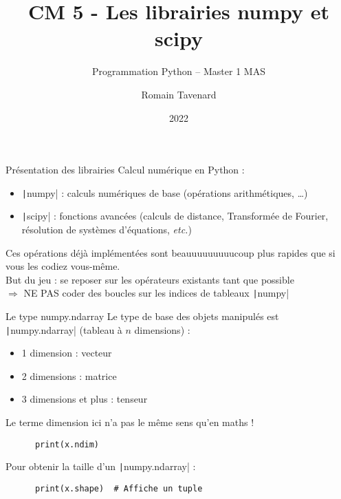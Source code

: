 \documentclass[10pt]{beamer}
\title[M1 MAS -- Python -- numpy]{CM 5 - Les librairies numpy et scipy}
\subtitle{Programmation Python -- Master 1 MAS}
\author{Romain Tavenard}
\date{2022}
\institute{%
\hypersetup{urlcolor=.}
\makebox[2.2ex][c]{\faEnvelope}\enspace\href{mailto:romain.tavenard@univ-rennes2.fr}{\texttt{romain.tavenard@univ-rennes2.fr}}\\%
}
\begin{document}
\maketitle

\begin{frame}[fragile]{Présentation des librairies}  
  Calcul numérique en Python :
  \begin{itemize}
    \item \texttt|numpy| : calculs numériques de base (opérations arithmétiques, \dots)
    \item \texttt|scipy| : fonctions avancées (calculs de distance, Transformée de Fourier, résolution de systèmes d'équations, \emph{etc.})
  \end{itemize}

  \pause

  Ces opérations déjà implémentées sont \alert{beauuuuuuuuucoup} plus rapides que si vous les codiez vous-même. \\
  \alert{But du jeu :} se reposer sur les opérateurs existants tant que possible \\
  $\Rightarrow$ \alert{NE PAS} coder des boucles sur les indices de tableaux \texttt|numpy|

\end{frame}

\begin{frame}[fragile]{Le type numpy.ndarray}  
  Le type de base des objets manipulés est \texttt|numpy.ndarray| (tableau à $n$ dimensions) :
  \begin{itemize}
    \item 1 dimension : vecteur
    \item 2 dimensions : matrice
    \item 3 dimensions et plus : tenseur
  \end{itemize}

  \alert{Le terme dimension ici n'a pas le même sens qu'en maths !}

  \begin{beamercodeblock}
    \begin{verbatim}
      print(x.ndim)
    \end{verbatim}
  \end{beamercodeblock}

  Pour obtenir la taille d'un \texttt|numpy.ndarray| : 

  \begin{beamercodeblock}
    \begin{verbatim}
      print(x.shape)  # Affiche un tuple
    \end{verbatim}
  \end{beamercodeblock}
\end{frame}
\end{document}
